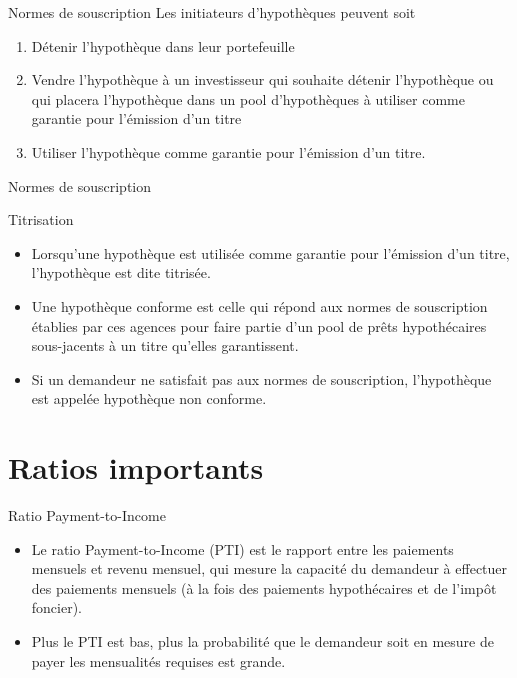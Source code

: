 \documentclass{beamer}
\begin{document}
\begin{frame}{Normes de souscription}
Les initiateurs d'hypothèques peuvent soit
\begin{enumerate}[label=\arabic*)]
\item Détenir l'hypothèque dans leur portefeuille
\item Vendre l'hypothèque à un investisseur qui souhaite détenir l'hypothèque ou qui placera l'hypothèque dans un pool d'hypothèques à utiliser comme garantie pour l'émission d'un titre
\item Utiliser l'hypothèque comme garantie pour l'émission d'un titre.
\end{enumerate}
\end{frame}

\begin{frame}{Normes de souscription}
\begin{block}{Titrisation}
\begin{itemize}[label=\bullet]
\item Lorsqu'une hypothèque est utilisée comme garantie pour l'émission d'un titre, l'hypothèque est dite titrisée.
\item Une hypothèque conforme est celle qui répond aux normes de souscription établies par ces agences pour faire partie d'un pool de prêts hypothécaires sous-jacents à un titre qu'elles garantissent.
\item Si un demandeur ne satisfait pas aux normes de souscription, l'hypothèque est appelée hypothèque non conforme.
\end{itemize}
\end{block}
\end{frame}

\section{Ratios importants}

\begin{frame}{Ratio Payment-to-Income}
\begin{itemize}[label=\bullet]
\item Le ratio Payment-to-Income (PTI) est le rapport entre les paiements mensuels et revenu mensuel, qui mesure la capacité du demandeur à effectuer des paiements mensuels (à la fois des paiements hypothécaires et de l'impôt foncier).
\vspace{0.5cm}
\item Plus le PTI est bas, plus la probabilité que le demandeur soit en mesure de payer les mensualités requises est grande.
\end{itemize}
\end{frame}
\end{document}
